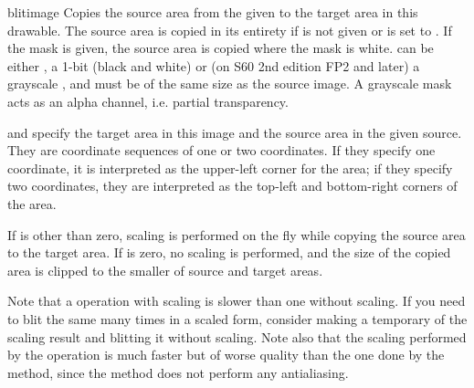 \begin{methoddesc}{blit}{image}
Copies the source area from the given  to the target area
in this drawable. The source area is copied in its entirety if
 is not given or is set to . If the mask is
given, the source area is copied where the mask is white. 
can be either , a 1-bit (black and white)  or
(on S60 2nd edition FP2 and later) a grayscale , and
must be of the same size as the source image. A grayscale mask acts
as an alpha channel, i.e. partial transparency.

 and  specify the target area in this image 
and the source area in the given source. They are coordinate sequences of 
one or two coordinates. If they specify one coordinate, it is interpreted as 
the upper-left corner for the area; if they specify two coordinates, they 
are interpreted as the top-left and bottom-right corners of the area.

If  is other than zero, scaling is performed on the fly while 
copying the source area to the target area. If  is zero, no 
scaling is performed, and the size of the copied area is clipped to the 
smaller of source and target areas.

Note that a  operation with scaling is slower than one without 
scaling. If you need to blit the same  many times in a scaled 
form, consider making a temporary  of the scaling result and 
blitting it without scaling. Note also that the scaling performed by the 
 operation is much faster but of worse quality than the one 
done by the  method, since the  method does not 
perform any antialiasing.
\end{methoddesc}

